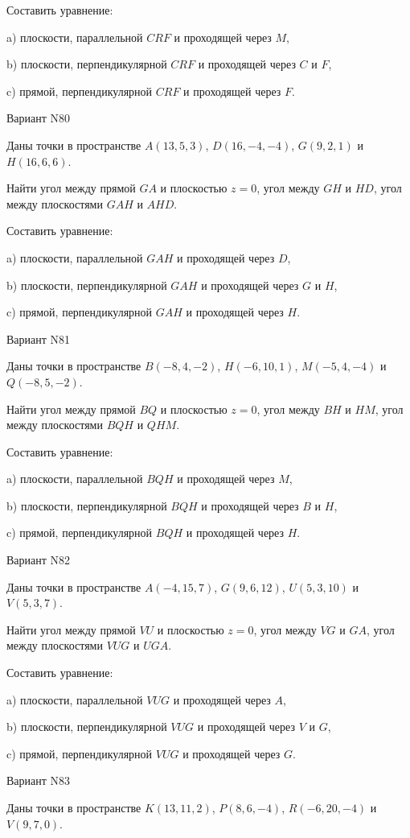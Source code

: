 \documentclass[11pt]{report}
\begin{document}
Составить уравнение: 

a) плоскости, параллельной $CRF$ и проходящей через $M$,

b) плоскости, перпендикулярной $CRF$ и проходящей через $C$ и $F$,

c) прямой, перпендикулярной $CRF$ и проходящей через $F$.

Вариант N80

Даны точки в пространстве
$A(13, 5, 3)$, $D(16, -4, -4)$, $G(9, 2, 1)$ и
$H(16, 6, 6)$.

Найти угол между прямой $GA$ и плоскостью $z = 0$, угол между $GH$ и $HD$, угол между плоскостями $GAH$ 
и $AHD$.

Составить уравнение: 

a) плоскости, параллельной $GAH$ и проходящей через $D$,

b) плоскости, перпендикулярной $GAH$ и проходящей через $G$ и $H$,

c) прямой, перпендикулярной $GAH$ и проходящей через $H$.

Вариант N81

Даны точки в пространстве
$B(-8, 4, -2)$, $H(-6, 10, 1)$, $M(-5, 4, -4)$ и
$Q(-8, 5, -2)$.

Найти угол между прямой $BQ$ и плоскостью $z = 0$, угол между $BH$ и $HM$, угол между плоскостями $BQH$ 
и $QHM$.

Составить уравнение: 

a) плоскости, параллельной $BQH$ и проходящей через $M$,

b) плоскости, перпендикулярной $BQH$ и проходящей через $B$ и $H$,

c) прямой, перпендикулярной $BQH$ и проходящей через $H$.

Вариант N82

Даны точки в пространстве
$A(-4, 15, 7)$, $G(9, 6, 12)$, $U(5, 3, 10)$ и
$V(5, 3, 7)$.

Найти угол между прямой $VU$ и плоскостью $z = 0$, угол между $VG$ и $GA$, угол между плоскостями $VUG$ 
и $UGA$.

Составить уравнение: 

a) плоскости, параллельной $VUG$ и проходящей через $A$,

b) плоскости, перпендикулярной $VUG$ и проходящей через $V$ и $G$,

c) прямой, перпендикулярной $VUG$ и проходящей через $G$.

Вариант N83

Даны точки в пространстве
$K(13, 11, 2)$, $P(8, 6, -4)$, $R(-6, 20, -4)$ и
$V(9, 7, 0)$.
\end{document}
